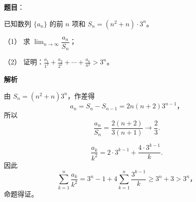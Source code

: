 \begin{answer}

\textbf{题目}：

已知数列 $\{a_n\}$ 的前 $n$ 项和 $S_n=(n^2+n)\cdot3^n$。

（1） 求 $\displaystyle\lim_{n\to\infty}\dfrac{a_n}{S_n}$；

（2） 证明：$\displaystyle\frac{a_1}{1^2}+\frac{a_2}{2^2}+\cdots+\frac{a_n}{n^2}>3^n$。

\textbf{解析}


由 $S_n=(n^2+n)3^n$，作差得
\nopagebreak[4]
\[
a_n=S_n-S_{n-1}=2n(n+2)3^{n-1}\text{，}
\]
所以
\nopagebreak[4]
\[
\frac{a_n}{S_n}=\frac{2(n+2)}{3(n+1)}\longrightarrow\frac23.
\]


\nopagebreak[4]
\[
\frac{a_k}{k^2}=2\cdot3^{k-1}+\frac{4\cdot3^{k-1}}k.
\]
因此
\nopagebreak[4]
\[
\sum_{k=1}^n\frac{a_k}{k^2}
=3^n-1+4\sum_{k=1}^n\frac{3^{k-1}}k
\geq3^n+3>3^n\text{，}
\]
命题得证。



\end{answer}

